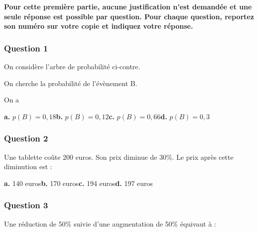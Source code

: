 \textbf{Pour cette première partie, aucune justification n'est demandée et une seule réponse est possible par question. Pour chaque question, reportez son numéro sur votre copie et indiquez votre réponse.}

\subsubsection*{Question 1}

\begin{minipage}[t]{0.5\textwidth}
On considère l'arbre de probabilité ci-contre.

On cherche la probabilité de l'évènement B.

\medskip

On a
\end{minipage}

\begin{minipage}[t]{0.45\textwidth}
\vspace{0pt}
\begin{center}
\end{center}
\end{minipage}

\textbf{a.} $p(B) = 0,18$\hfill \textbf{b.} $p(B) = 0,12$\hfill \textbf{c.} $p(B) = 0,66$\hfill \textbf{d.} $p(B) = 0,3$

\subsubsection*{Question 2}
Une tablette coûte 200 euros. Son prix diminue de 30\%. Le prix après cette diminution est :

\textbf{a.} 140 euros\hfill \textbf{b.} 170 euros\hfill \textbf{c.} 194 euros\hfill \textbf{d.} 197 euros

\subsubsection*{Question 3}
Une réduction de 50\% suivie d'une augmentation de 50\% équivaut à :

